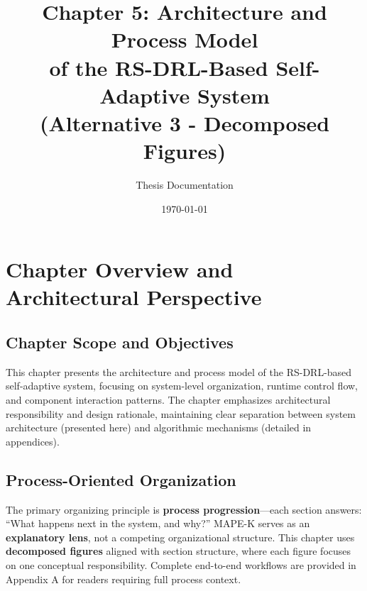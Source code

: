 \documentclass[11pt,a4paper]{article}
\title{Chapter 5: Architecture and Process Model\\of the RS-DRL-Based Self-Adaptive System\\(Alternative 3 - Decomposed Figures)}
\author{Thesis Documentation}
\date{\today}
\begin{document}
\maketitle

\tableofcontents
\newpage

\setcounter{section}{0}
\renewcommand{\thesection}{5.\arabic{section}}
\renewcommand{\thesubsection}{5.\arabic{section}.\arabic{subsection}}
\renewcommand{\thesubsubsection}{5.\arabic{section}.\arabic{subsection}.\arabic{subsubsection}}



\section{Chapter Overview and Architectural Perspective}
\label{sec:overview}

\subsection{Chapter Scope and Objectives}

This chapter presents the architecture and process model of the RS-DRL-based self-adaptive system, focusing on system-level organization, runtime control flow, and component interaction patterns. The chapter emphasizes architectural responsibility and design rationale, maintaining clear separation between system architecture (presented here) and algorithmic mechanisms (detailed in appendices).

\subsection{Process-Oriented Organization}

The primary organizing principle is \textbf{process progression}---each section answers: ``What happens next in the system, and why?'' MAPE-K serves as an \textbf{explanatory lens}, not a competing organizational structure. This chapter uses \textbf{decomposed figures} aligned with section structure, where each figure focuses on one conceptual responsibility. Complete end-to-end workflows are provided in Appendix A for readers requiring full process context.
\end{document}

